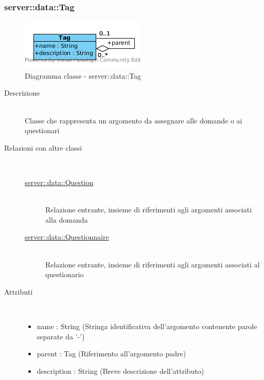 \subsubsection[Tag]{server::data::Tag}
\begin{center}
			\begin{figure}[H]
				\centering \includegraphics[scale=4, max width=\textwidth, max height=\myheight]{../img/diagrammiClassi/server/data/Tag.png}
				\caption{Diagramma classe - server::data::Tag}
			\end{figure}
		\end{center}\begin{description}
\item[Descrizione] \hfill \\
 Classe che rappresenta un argomento da assegnare alle domande o ai questionari
\item[Relazioni con altre classi] \hfill \\
 \vspace{-7mm}
\begin{description}
\item[\hyperlink{server::data::Question}{server::data::Question}] \hfill \\
 Relazione entrante, insieme di riferimenti agli argomenti associati alla domanda
\item[\hyperlink{server::data::Questionnaire}{server::data::Questionnaire}] \hfill \\
 Relazione entrante, insieme di riferimenti agli argomenti associati al questionario
\end{description}

\item[Attributi] \hfill \\
 \vspace{-7mm}
\begin{itemize}
\item name : String (Stringa identificativa dell'argomento contenente parole separate da '-')
\item parent : Tag (Riferimento all'argomento padre)
\item description : String (Breve descrizione dell'attributo)
\end{itemize}

\end{description}

